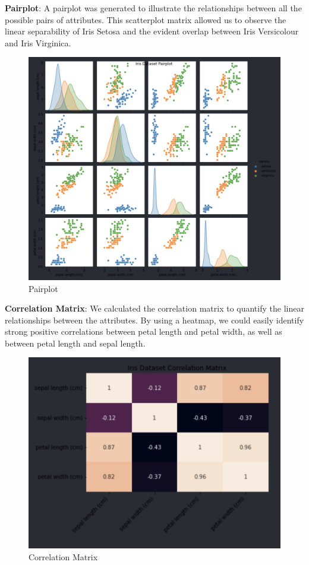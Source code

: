 \documentclass[conference]{inc/IEEEtran}
\begin{document}
\textbf{Pairplot}: A pairplot was generated to illustrate the relationships between all the possible pairs of attributes.
  This scatterplot matrix allowed us to observe the linear separability of Iris Setosa and the evident overlap between
  Iris Versicolour and Iris Virginica.

  \begin{figure}
    \includegraphics[width=\linewidth]{figures/pairplot.png}
    \caption{Pairplot}
    \label{fig:boat1}
  \end{figure}

\textbf{Correlation Matrix}: We calculated the correlation matrix to quantify the linear relationships between the attributes.
  By using a heatmap, we could easily identify strong positive correlations between petal length and petal width, as well as
  between petal length and sepal length.

  \begin{figure}
    \includegraphics[width=\linewidth]{figures/correlationmatrix.png}
    \caption{Correlation Matrix}
    \label{fig:boat1}
  \end{figure}
\end{document}
